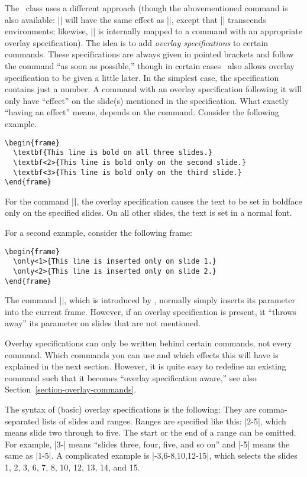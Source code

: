 The \beamer\ class uses a different approach (though the abovementioned command is also available: || will have the same effect as ||, except that |\onslide| transcends environments; likewise, |\pause| is internally mapped to a command with an appropriate overlay specification). The idea is to add \emph{overlay specifications} to certain commands. These specifications are always given in pointed brackets and follow the command ``as soon as possible,'' though in certain cases \beamer\ also allows overlay specification to be given a little later. In the simplest case, the specification contains just a number. A command with an overlay specification following it will only have ``effect'' on the slide(s) mentioned in the specification. What exactly ``having an effect'' means, depends on the command. Consider the following example.
\begin{verbatim}
\begin{frame}
  \textbf{This line is bold on all three slides.}
  \textbf<2>{This line is bold only on the second slide.}
  \textbf<3>{This line is bold only on the third slide.}
\end{frame}
\end{verbatim}

For the command |\textbf|, the overlay specification causes the text to be set in boldface only on the specified slides. On all other slides, the text is set in a normal font.

For a second example, consider the following frame:
\begin{verbatim}
\begin{frame}
  \only<1>{This line is inserted only on slide 1.}
  \only<2>{This line is inserted only on slide 2.}
\end{frame}
\end{verbatim}

The command |\only|, which is introduced by \beamer, normally simply inserts its parameter into the current frame. However, if an overlay specification is present, it ``throws away'' its parameter on slides that are not mentioned.

Overlay specifications can only be written behind certain commands, not every command. Which commands you can use and which effects this will have is explained in the next section. However, it is quite easy to redefine an existing command such that it becomes ``overlay specification aware,'' see also Section~\ref{section-overlay-commands}.

The syntax of (basic) overlay specifications is the following: They are comma-separated lists of slides and ranges. Ranges are specified like this: |2-5|, which means slide two through to five. The start or the end of a range can be omitted. For example, |3-| means ``slides three, four, five, and so on'' and |-5| means the same as |1-5|. A complicated example is |-3,6-8,10,12-15|, which selects the slides 1, 2, 3, 6, 7, 8, 10, 12, 13, 14, and 15.


